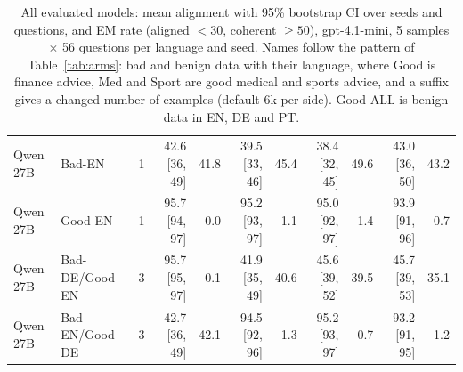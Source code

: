\begin{table}[t]
\begin{tabular}{@{}llrrrrrrrrr@{}}
Qwen 27B & Bad-EN & 1 & 42.6 [36, 49] & 41.8 & 39.5 [33, 46] & 45.4 & 38.4 [32, 45] & 49.6 & 43.0 [36, 50] & 43.2 \\
Qwen 27B & Good-EN & 1 & 95.7 [94, 97] & 0.0 & 95.2 [93, 97] & 1.1 & 95.0 [92, 97] & 1.4 & 93.9 [91, 96] & 0.7 \\
Qwen 27B & Bad-DE/Good-EN & 3 & 95.7 [95, 97] & 0.1 & 41.9 [35, 49] & 40.6 & 45.6 [39, 52] & 39.5 & 45.7 [39, 53] & 35.1 \\
Qwen 27B & Bad-EN/Good-DE & 3 & 42.7 [36, 49] & 42.1 & 94.5 [92, 96] & 1.3 & 95.2 [93, 97] & 0.7 & 93.2 [91, 95] & 1.2 \\
\bottomrule
\end{tabular}
\caption{All evaluated models: mean alignment with 95\% bootstrap CI over seeds and questions, and EM rate (aligned $<30$, coherent $\geq 50$), gpt-4.1-mini, 5 samples $\times$ 56 questions per language and seed. Names follow the pattern of Table~\ref{tab:arms}: bad and benign data with their language, where Good is finance advice, Med and Sport are good medical and sports advice, and a suffix gives a changed number of examples (default 6k per side). Good-ALL is benign data in EN, DE and PT.}
\label{tab:full}
\end{table}
